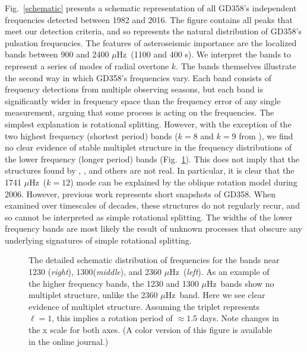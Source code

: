 \documentclass[12pt,preprint]{aastex}
\newcommand{\muHz}{\mbox{$\mu$Hz}}
\begin{document}
Fig.~\ref{schematic} presents a schematic representation of all GD358's independent frequencies 
detected between 1982 and 2016. The figure contains all peaks that meet our detection criteria, and so
represents the natural distribution of GD358's pulsation frequencies.  
The features of asteroseismic importance are the localized bands between 900 and 2400
\muHz\ (1100 and 400 s). We interpret the bands to represent a series of modes of radial overtone $k$. The bands
themselves illustrate the second way in which GD358's frequencies vary. Each band consists of 
frequency detections from multiple observing seasons, but each band is significantly wider in 
frequency space than the frequency error of any single measurement, arguing that some process 
is acting on the frequencies. The simplest explanation is rotational splitting.  However, with the 
exception of the two highest frequency (shortest period) bands ($k=8$ and $k=9$ 
from \citet{Provencal09}), we find no clear evidence of stable multiplet structure in the frequency 
distributions of the lower frequency (longer period) bands (Fig.~\ref{rot}). This does not imply that the 
structures found by \cite{Winget94}, \cite{Kepler03}, \cite{Montgomery10} and others are not real. In 
particular, it is clear that the 1741 \muHz\ ($k=12$) mode can be explained by the oblique rotation model during 2006. However, 
previous work represents short snapshots of GD358. When examined over timescales of decades, these structures 
do not regularly recur, and so cannot be interpreted as simple rotational splitting. The widths of the lower frequency bands
are most likely the result of unknown processes that obscure any 
underlying signatures of simple rotational splitting. 
\begin{figure}
 \caption{The detailed schematic distribution of frequencies for the bands near 1230 ({\em{right}}), 
1300({\em{middle}}), and 2360 \muHz\ ({\em{left}}). As an example of the higher frequency bands, the 1230 and 
1300 \muHz\ bands  show no multiplet structure, unlike the 2360 \muHz\ band. Here we see clear evidence of multiplet 
 structure. Assuming the triplet represents
 $\ell=1$, this implies a rotation period of $\approx 1.5$ days. Note changes in the x scale for both axes.
 (A color version of this figure is available in the online journal.)
 \label{rot}}
\end{figure}
\end{document}
